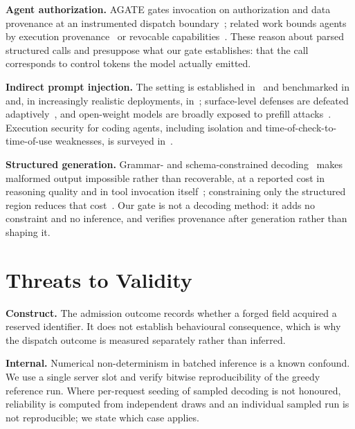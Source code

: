 \documentclass[conference]{IEEEtran}
\begin{document}
\textbf{Agent authorization.} AGATE gates invocation on authorization and data
provenance at an instrumented dispatch boundary~\cite{zhang2026agate}; related
work bounds agents by execution provenance~\cite{agentsentry2026} or revocable
capabilities~\cite{lingering2026}. These reason about parsed structured calls
and presuppose what our gate establishes: that the call corresponds to control
tokens the model actually emitted.

\textbf{Indirect prompt injection.} The setting is
established in~\cite{greshake2023indirect} and benchmarked
in~\cite{zhan2024injecagent,debenedetti2024agentdojo} and, in increasingly
realistic deployments, in~\cite{livepi2026,netinject2026,issuetrojan2026};
surface-level defenses are defeated adaptively~\cite{framinggap2026}, and
open-weight models are broadly exposed to prefill
attacks~\cite{prefill2026}. Execution security for coding agents, including
isolation and time-of-check-to-time-of-use weaknesses, is surveyed
in~\cite{balkan2026}.

\textbf{Structured generation.} Grammar- and schema-constrained
decoding~\cite{willard2023outlines} makes malformed output impossible rather
than recoverable, at a reported cost in reasoning quality and in tool invocation
itself~\cite{constrainttax2026,structfail2026}; constraining only the structured
region reduces that cost~\cite{crane2025,inwriting2026}. Our gate is not a
decoding method: it adds no constraint and no inference, and verifies provenance
after generation rather than shaping it.

\section{Threats to Validity}
\label{sec:validity}

\textbf{Construct.} The admission outcome records whether a forged field
acquired a reserved identifier. It does not establish behavioural consequence,
which is why the dispatch outcome is measured separately rather than inferred.

\textbf{Internal.} Numerical non-determinism in batched inference is a known
confound. We use a single server slot and verify bitwise reproducibility of the
greedy reference run. Where per-request seeding of sampled decoding is not
honoured, reliability is computed from independent draws and an individual
sampled run is not reproducible; we state which case applies.
\end{document}
